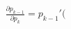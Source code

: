 \documentclass[preview]{standalone}
\begin{document}
\begin{align*}
\frac{\partial p_{k-1}}{\partial p_k} = p_{k-1}'(
\end{align*}
\end{document}
